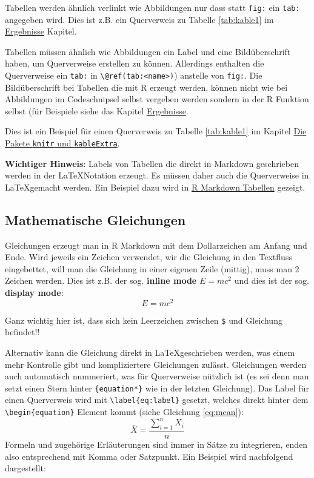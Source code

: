 \documentclass[a4paper,12pt]{article}
\begin{document}
Tabellen werden ähnlich verlinkt wie Abbildungen nur dass statt \texttt{fig:} ein \texttt{tab:} angegeben wird. Dies ist z.B. ein Querverweis zu Tabelle \ref{tab:kable1} im \protect\hyperlink{ergebnisse}{Ergebnisse} Kapitel.

Tabellen müssen ähnlich wie Abbildungen ein Label und eine Bildüberschrift haben, um Querverweise erstellen zu können. Allerdings enthalten die Querverweise ein \texttt{tab:} in \texttt{\textbackslash{}@ref(tab:\textless{}name\textgreater{})}) anstelle von \texttt{fig:}. Die Bildüberschrift bei Tabellen die mit R erzeugt werden, können nicht wie bei Abbildungen im Codeschnipsel selbst vergeben werden sondern in der R Funktion selbst (für Beispiele siehe das Kapitel \protect\hyperlink{ergebnisse}{Ergebnisse}.

Dies ist ein Beispiel für einen Querverweis zu Tabelle \ref{tab:kable1} im Kapitel \protect\hyperlink{die-pakete-knitr-und-kableextra}{Die Pakete \texttt{knitr} und \texttt{kableExtra}}.

\textbf{Wichtiger Hinweis}: Labels von Tabellen die direkt in Markdown geschrieben werden in der \LaTeX Notation erzeugt. Es müssen daher auch die Querverweise in \LaTeX gemacht werden. Ein Beispiel dazu wird in \protect\hyperlink{r-markdown-tabellen}{R Markdown Tabellen} gezeigt.

\hypertarget{mathematische-gleichungen}{%
\subsection{Mathematische Gleichungen}\label{mathematische-gleichungen}}

Gleichungen erzeugt man in R Markdown mit dem Dollarzeichen am Anfang und Ende. Wird jeweils ein Zeichen verwendet, wir die Gleichung in den Textfluss eingebettet, will man die Gleichung in einer eigenen Zeile (mittig), muss man 2 Zeichen werden. Dies ist z.B. der sog. \textbf{inline mode} \(E = mc^2\) und dies ist der sog. \textbf{display mode}: \[E = mc^2\]

Ganz wichtig hier ist, dass sich kein Leerzeichen zwischen \texttt{\$} und Gleichung befindet!!

Alternativ kann die Gleichung direkt in \LaTeX geschrieben werden, was einem mehr Kontrolle gibt und kompliziertere Gleichungen zulässt. Gleichungen werden auch automatisch nummeriert, was für Querverweise nützlich ist (es sei denn man setzt einen Stern hinter \texttt{\{equation*\}} wie in der letzten Gleichung). Das Label für einen Querverweis wird mit \texttt{\textbackslash{}label\{eq:label\}} gesetzt, welches direkt hinter dem \texttt{\textbackslash{}begin\{equation\}} Element kommt (siehe Gleichung \eqref{eq:mean}):
\begin{equation} \label{eq:mean}
  \bar{X} = \frac{\sum_{i=1}^n X_i}{n} 
\end{equation}
Formeln und zugehörige Erläuterungen sind immer in Sätze zu integrieren, enden also entsprechend mit Komma oder Satzpunkt. Ein Beispiel wird nachfolgend dargestellt:
\end{document}
